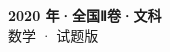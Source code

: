 \documentclass[zihao=-4, a4paper]{ctexart}
\begin{document}
\begin{center}
  {\Large\bfseries 2020 年·全国Ⅱ卷·文科}\\[4pt]
  {\large 数学 · 试题版}
\end{center}
\medskip
{}

\end{document}
